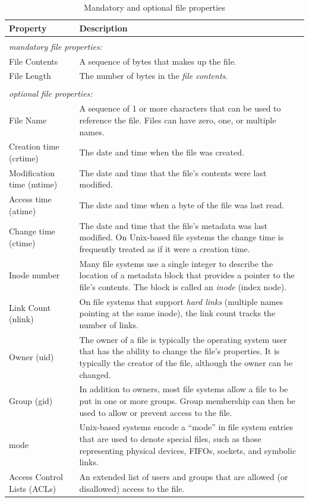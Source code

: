 \documentclass[11pt,letter]{article}
\begin{document}
\begin{table}
\begin{tabularx}{\textwidth}{lX}
Property & Description \\
\hline
\\
\multicolumn{2}{l}{\textit{\small mandatory file properties:}}\\
File Contents & A sequence of bytes that makes up the file.\\
File Length   & The number of bytes in the \emph{file contents}.\\
\\
\multicolumn{2}{l}{\textit{\small optional file properties:}}\\
File Name & A sequence of 1 or more characters that can be used to reference the file. Files can have
zero, one, or multiple names.\\
Creation time (crtime) & The date and time when the file was created.\\
Modification time (mtime) & The date and time that the file's contents were last modified.\\
Access time (atime) & The date and time when a  byte of the file was last read.\\
Change time (ctime) & The date and time that the file's metadata was last modified. On Unix-based file systems
   the change time is frequently treated as if it were a creation time.\\
Inode number & Many file systems use a single integer to describe the location of a metadata block that provides a pointer to the file's contents. The block is called an \emph{inode} (index node).\\
Link Count (nlink) & On file systems that support \emph{hard links} (multiple names pointing at the same inode), the link count tracks the number of links.\\
Owner (uid) & The owner of a file is typically the operating system user that has the ability to change the file's properties. It is typically the creator of the file, although the owner can be changed.\\
Group (gid) & In addition to owners, most file systems allow a file to be put in one or more groups. Group membership can then be used to allow or prevent access to the file.\\
mode & Unix-based systems encode a ``mode'' in file system entries that are used to denote special files, such as those representing physical devices, FIFOs, sockets, and symbolic links.\\
Access Control Lists (ACLs) & An extended list of users and groups that are allowed (or disallowed) access to the file.
\end{tabularx}
\caption{Mandatory and optional file properties}\label{file-properties}
\end{table}
\end{document}
